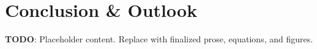 \section{Conclusion \& Outlook}
\label{sec:conclusion-outlook}

\textbf{TODO}: Placeholder content. Replace with finalized prose, equations, and figures.

